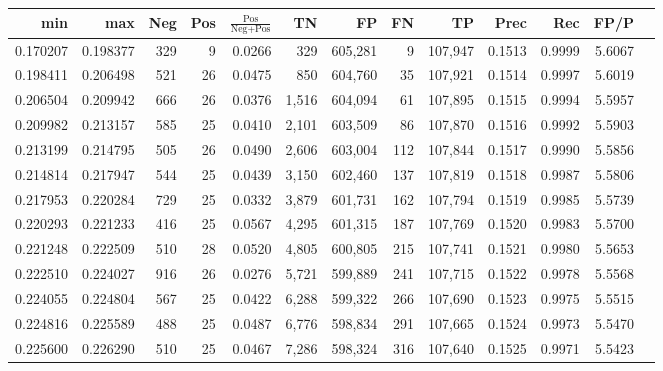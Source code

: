 \begin{tabular}{rrrrrrrrrrrrr}
\toprule
     min &      max & Neg & Pos & $\frac{\text{Pos}}{\text{Neg}+\text{Pos}}$ &      TN &      FP &      FN &      TP &   Prec &    Rec &   FP/P \\
\midrule
0.170207 & 0.198377 & 329 &   9 &                                     0.0266 &     329 & 605,281 &       9 & 107,947 & 0.1513 & 0.9999 & 5.6067 \\
0.198411 & 0.206498 & 521 &  26 &                                     0.0475 &     850 & 604,760 &      35 & 107,921 & 0.1514 & 0.9997 & 5.6019 \\
0.206504 & 0.209942 & 666 &  26 &                                     0.0376 &   1,516 & 604,094 &      61 & 107,895 & 0.1515 & 0.9994 & 5.5957 \\
0.209982 & 0.213157 & 585 &  25 &                                     0.0410 &   2,101 & 603,509 &      86 & 107,870 & 0.1516 & 0.9992 & 5.5903 \\
0.213199 & 0.214795 & 505 &  26 &                                     0.0490 &   2,606 & 603,004 &     112 & 107,844 & 0.1517 & 0.9990 & 5.5856 \\
0.214814 & 0.217947 & 544 &  25 &                                     0.0439 &   3,150 & 602,460 &     137 & 107,819 & 0.1518 & 0.9987 & 5.5806 \\
0.217953 & 0.220284 & 729 &  25 &                                     0.0332 &   3,879 & 601,731 &     162 & 107,794 & 0.1519 & 0.9985 & 5.5739 \\
0.220293 & 0.221233 & 416 &  25 &                                     0.0567 &   4,295 & 601,315 &     187 & 107,769 & 0.1520 & 0.9983 & 5.5700 \\
0.221248 & 0.222509 & 510 &  28 &                                     0.0520 &   4,805 & 600,805 &     215 & 107,741 & 0.1521 & 0.9980 & 5.5653 \\
0.222510 & 0.224027 & 916 &  26 &                                     0.0276 &   5,721 & 599,889 &     241 & 107,715 & 0.1522 & 0.9978 & 5.5568 \\
0.224055 & 0.224804 & 567 &  25 &                                     0.0422 &   6,288 & 599,322 &     266 & 107,690 & 0.1523 & 0.9975 & 5.5515 \\
0.224816 & 0.225589 & 488 &  25 &                                     0.0487 &   6,776 & 598,834 &     291 & 107,665 & 0.1524 & 0.9973 & 5.5470 \\
0.225600 & 0.226290 & 510 &  25 &                                     0.0467 &   7,286 & 598,324 &     316 & 107,640 & 0.1525 & 0.9971 & 5.5423 \\

\end{tabular}
